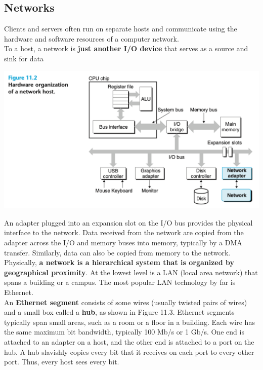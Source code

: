 \documentclass[11pt]{article}
\begin{document}
\subsection{Networks}
\label{sec:org03e1add}
Clients and servers often run on separate hosts and communicate using the hardware and software resources of a computer network.\\

To a host, a network is \textbf{just another I/O device} that serves as a source and sink for data\\

\begin{center}
\includegraphics[width=.9\linewidth]{pics/figure11.2-hardware-organization-of-a-network-host.png}
\end{center}

An adapter plugged into an expansion slot on the I/O bus provides the physical interface to the network. Data received from the network are copied from the adapter across the I/O and memory buses into memory, typically by a DMA transfer. Similarly, data can also be copied from memory to the network.\\


Physically, \textbf{a network is a hierarchical system that is organized by geographical proximity}. At the lowest level is a LAN (local area network) that spans a building or a campus. The most popular LAN technology by far is Ethernet.\\


An \textbf{Ethernet segment} consists of some wires (usually twisted pairs of wires) and a small box called a \textbf{hub}, as shown in Figure 11.3. Ethernet segments typically span small areas, such as a room or a floor in a building. Each wire has the same maximum bit bandwidth, typically 100 Mb/s or 1 Gb/s. One end is attached to an adapter on a host, and the other end is attached to a port on the hub. A hub slavishly copies every bit that it receives on each port to every other port. Thus, every host sees every bit.\\
\end{document}
